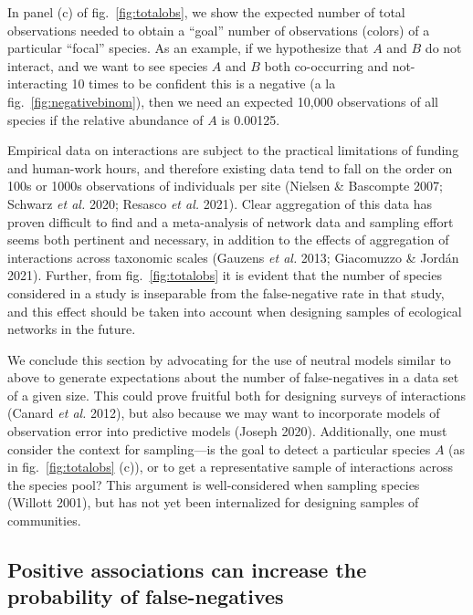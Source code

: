 \documentclass[10pt,oneside]{article}
\begin{document}
In panel (c) of fig.~\ref{fig:totalobs}, we show the expected number of
total observations needed to obtain a ``goal'' number of observations
(colors) of a particular ``focal'' species. As an example, if we
hypothesize that \(A\) and \(B\) do not interact, and we want to see
species \(A\) and \(B\) both co-occurring and not-interacting 10 times
to be confident this is a negative (a la fig.~\ref{fig:negativebinom}),
then we need an expected 10,000 observations of all species if the
relative abundance of \(A\) is 0.00125.

Empirical data on interactions are subject to the practical limitations
of funding and human-work hours, and therefore existing data tend to
fall on the order on 100s or 1000s observations of individuals per site
(Nielsen \& Bascompte 2007; Schwarz \emph{et al.} 2020; Resasco \emph{et
al.} 2021). Clear aggregation of this data has proven difficult to find
and a meta-analysis of network data and sampling effort seems both
pertinent and necessary, in addition to the effects of aggregation of
interactions across taxonomic scales (Gauzens \emph{et al.} 2013;
Giacomuzzo \& Jordán 2021). Further, from fig.~\ref{fig:totalobs} it is
evident that the number of species considered in a study is inseparable
from the false-negative rate in that study, and this effect should be
taken into account when designing samples of ecological networks in the
future.

We conclude this section by advocating for the use of neutral models
similar to above to generate expectations about the number of
false-negatives in a data set of a given size. This could prove fruitful
both for designing surveys of interactions (Canard \emph{et al.} 2012),
but also because we may want to incorporate models of observation error
into predictive models (Joseph 2020). Additionally, one must consider
the context for sampling---is the goal to detect a particular species
\(A\) (as in fig.~\ref{fig:totalobs} (c)), or to get a representative
sample of interactions across the species pool? This argument is
well-considered when sampling species (Willott 2001), but has not yet
been internalized for designing samples of communities.

\hypertarget{positive-associations-can-increase-the-probability-of-false-negatives}{%
\subsection{Positive associations can increase the probability of
false-negatives}\label{positive-associations-can-increase-the-probability-of-false-negatives}}
\end{document}
